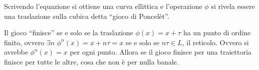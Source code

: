 Scrivendo l'equazione si ottiene una curva ellittica e l'operazione
$\phi$ si rivela essere una traslazione sulla cubica detta ``gioco di
Poncelèt''.

Il gioco ``finisce'' se e solo se la traslazione $\phi(x) = x + \tau$ ha
un punto di ordine finito, ovvero $\exists n$
$\phi^n (x) = x + n\tau = x$ se e solo se $n\tau \in L$, il
reticolo. Ovvero si avrebbe $\phi^n(x) = x$ per ogni punto. Allora se il
gioco finisce per una traiettoria finisce per tutte le altre, cosa che
non è per nulla banale.

